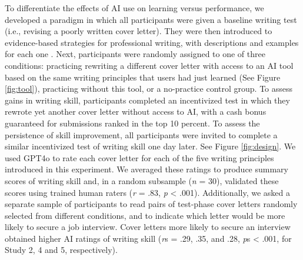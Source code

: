 \documentclass[11pt]{report}
\begin{document}
\begin{mainf}
  To differentiate the effects of AI use on learning versus performance, we developed a paradigm in which all participants were given a baseline writing test (i.e., revising a poorly written cover letter).
  They were then introduced to evidence-based strategies for professional writing, with descriptions and examples for each one \cite{rogers2023,shulman2024}. 
  Next, participants were randomly assigned to one of three conditions: practicing rewriting a different cover letter with access to an AI tool based on the same writing principles that users had just learned (See Figure \ref{fig:tool}), practicing without this tool, or a no-practice control group. 
  To assess gains in writing skill, participants completed an incentivized test in which they rewrote yet another cover letter without access to AI, with a cash bonus guaranteed for submissions ranked in the top 10 percent. 
  To assess the persistence of skill improvement, all participants were invited to complete a similar incentivized test of writing skill one day later.
  See Figure \ref{fig:design}.
  We used GPT4o to rate each cover letter for each of the five writing principles introduced in this experiment. We averaged these ratings to produce summary scores of writing skill and, in a random subsample (\textit{n} = 30), validated these scores using trained human raters (\textit{r} = .83, \textit{p} < .001).
  Additionally, we asked a separate sample of participants to read pairs of test-phase cover letters randomly selected from different conditions, and to indicate which letter would be more likely to secure a job interview. 
  Cover letters more likely to secure an interview obtained higher AI ratings of writing skill (\textit{r}s = .29, .35, and .28, \textit{p}s < .001, for Study 2, 4 and 5, respectively). 



\end{mainf}
\end{document}
